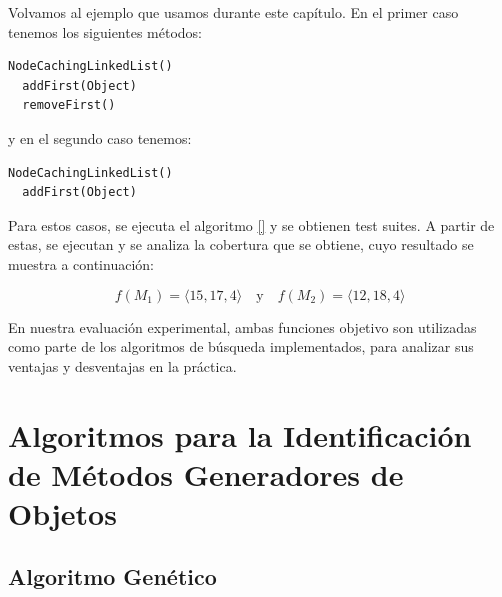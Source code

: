 Volvamos al ejemplo que usamos durante este capítulo. En el primer caso tenemos los siguientes métodos:
\vspace{5pt} 

\begin{lstlisting}[numbers=none, caption=Conjunto de métodos \( M_1 \)]
  NodeCachingLinkedList()
  addFirst(Object)
  removeFirst()
\end{lstlisting} 

y en el segundo caso tenemos:

\begin{lstlisting}[numbers=none, caption=Conjunto de métodos \( M_2 \)]
  NodeCachingLinkedList()
  addFirst(Object)
\end{lstlisting}


Para estos casos, se ejecuta el algoritmo \ref{}  y se obtienen test suites.
A partir de estas, se ejecutan y se analiza la cobertura que se obtiene, cuyo
resultado se muestra a continuación:

\[
f(M_1) = \langle 15, 17, 4 \rangle \quad \text{y} \quad f(M_2) = \langle 12, 18, 4 \rangle
\]


En nuestra evaluación experimental, ambas funciones objetivo son utilizadas como
parte de los algoritmos de búsqueda implementados, para analizar sus ventajas y
desventajas en la práctica. 

\section{Algoritmos para la Identificación de Métodos Generadores de Objetos}
\label{sec:algorithms}


\subsection{Algoritmo Genético}
\label{alg:approachGA}


